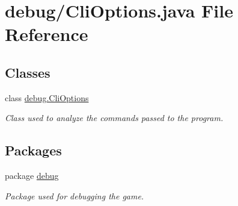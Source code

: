 \hypertarget{a00041}{\section{debug/\-Cli\-Options.java File Reference}
\label{a00041}
}
\subsection*{Classes}
\begin{DoxyCompactItemize}
\item 
class \hyperlink{a00006}{debug.\-Cli\-Options}
\begin{DoxyCompactList}\small\item\em Class used to analyze the commands passed to the program. \end{DoxyCompactList}\end{DoxyCompactItemize}
\subsection*{Packages}
\begin{DoxyCompactItemize}
\item 
package \hyperlink{a00080}{debug}
\begin{DoxyCompactList}\small\item\em Package used for debugging the game. \end{DoxyCompactList}\end{DoxyCompactItemize}

